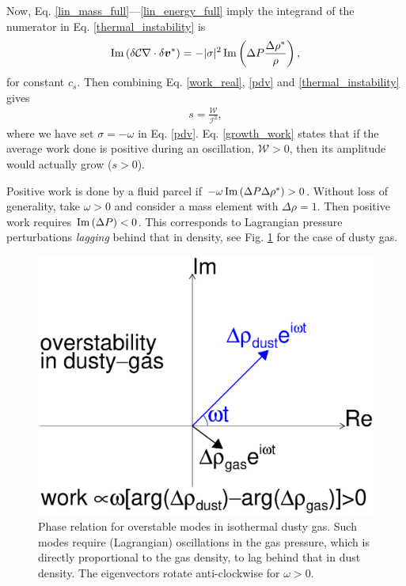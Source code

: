 Now, Eq. \ref{lin_mass_full}---\ref{lin_energy_full} 
imply the integrand of the numerator in Eq. \ref{thermal_instability} 
is 
\begin{align} 
  \operatorname{Im} \left(\delta \mathcal{C}
  \nabla\cdot\delta \bm{v}^*\right) = 
  -|\sigma|^2\operatorname{Im} \left(\Delta P 
  \frac{\Delta\rho^*}{\rho}\right), \label{pdv}
\end{align}
for constant $c_s$. 
Then combining Eq. \ref{work_real}, \ref{pdv} and
\ref{thermal_instability} 
gives  
\begin{align}
s = \frac{\mathcal{W}}{\mathcal{I}^2}, \label{growth_work}
\end{align}
where we have set $\sigma= - \omega$ in 
Eq. \ref{pdv}. Eq. \ref{growth_work} states that if the average work
done is positive during an oscillation, $\mathcal{W}>0$, 
then its amplitude would actually grow ($s>0$).  %

Positive work is done by a fluid parcel if $-\omega \operatorname{Im}\left(\Delta  
P\Delta\rho^*\right)>0$. Without loss of generality, take $\omega>0$
and consider a mass element with $\Delta\rho = 1$. Then positive work 
requires $\operatorname{Im}\left(\Delta
P\right)<0$.  This corresponds to Lagrangian pressure perturbations \emph{lagging}
behind that in density, see Fig. \ref{lag_cartoon}
for the case of dusty gas.   



\begin{figure}
  \includegraphics[width=\linewidth,clip=true,trim=0cm 5cm 0cm 0cm]{figures/lag}
  \caption{Phase relation for overstable modes in isothermal dusty
    gas. Such modes require (Lagrangian) oscillations in the gas
    pressure, which is directly proportional to the gas density, to
    lag behind that in dust density. The eigenvectors rotate anti-clockwise for $\omega>0$. 
    \label{lag_cartoon}
  }
\end{figure}


